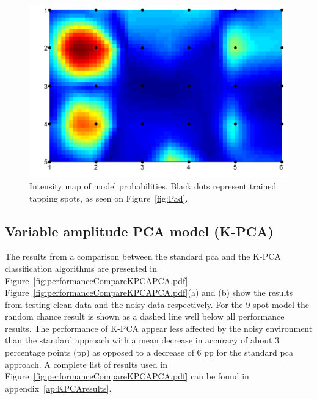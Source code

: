 \begin{figure}[!]
\centering
\includegraphics[width=150mm]{padPlot.pdf}
\caption{Intensity map of model probabilities. Black dots represent trained tapping spots, as seen on Figure~\ref{fig:Pad}. }\label{fig:padPlot}
\end{figure}

\subsection{Variable amplitude PCA model (K-PCA)}

The results from a comparison between the standard \gls{pca} and the K-PCA classification algorithms are presented in Figure~\ref{fig:performanceCompareKPCAPCA.pdf}. Figure~\ref{fig:performanceCompareKPCAPCA.pdf}(a) and (b) show the results from testing clean data and the noisy data respectively. For the 9 spot model the random chance result is shown as a dashed line well below all performance results. The performance of K-PCA appear less affected by the noisy environment than the standard approach with a mean decrease in accuracy of about 3 percentage points (pp) as opposed to a decrease of 6 pp for the standard \gls{pca} approach. A complete list of results used in Figure~\ref{fig:performanceCompareKPCAPCA.pdf} can be found in appendix~\ref{ap:KPCAresults}.

